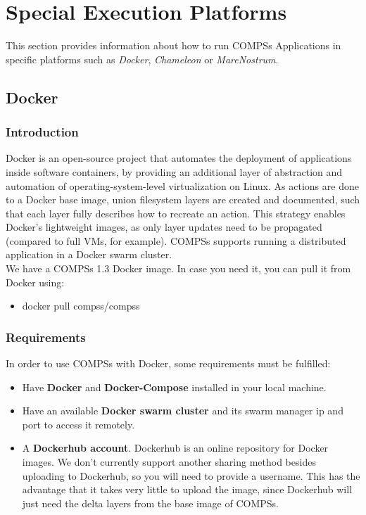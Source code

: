\section{Special Execution Platforms}
\label{sec:Execution_Platfors}

This section provides information about how to run COMPSs Applications in specific platforms such as \textit{Docker},
\textit{Chameleon} or \textit{MareNostrum}.


\subsection{Docker}

\subsubsection{Introduction}
Docker is an open-source project that automates the deployment of applications inside software containers, 
by providing an additional layer of abstraction and automation of operating-system-level virtualization on Linux.
As actions are done to a Docker base image, union filesystem layers are created and documented, such that each layer fully 
describes how to recreate an action. This strategy enables Docker's lightweight images, as only layer updates need to be 
propagated (compared to full VMs, for example).
COMPSs supports running a distributed application in a Docker swarm cluster.
\\
We have a COMPSs 1.3 Docker image. In case you need it, you can pull it from Docker using:
\begin{itemize}  
\item docker pull compss/compss
\end{itemize}

\subsubsection{Requirements}
In order to use COMPSs with Docker, some requirements must be fulfilled:
\begin{itemize}  
\item Have \textbf{Docker} and \textbf{Docker-Compose} installed in your local machine.
\item Have an available \textbf{Docker swarm cluster} and its swarm manager ip and port to access it remotely.
\item A \textbf{Dockerhub account}. Dockerhub is an online repository for Docker images. We don't currently support
      another sharing method besides uploading to Dockerhub, so you will need to provide a username.
      This has the advantage that it takes very little to upload the image, since Dockerhub 
      will just need the delta layers from the base image of COMPSs.
\end{itemize}

